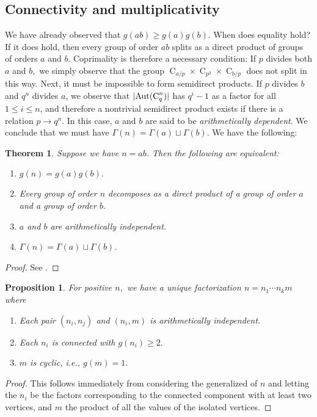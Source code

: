 \documentclass{article}
\DeclarePairedDelimiter\abs{\lvert}{\rvert}
\newcommand{\aut}[1]{\operatorname{Aut}(#1)}
\newcommand{\cyc}[1]{\operatorname{C}_{#1}}
\theoremstyle{plain}
\newtheorem{thm}{Theorem}[section]
\newtheorem{prop}{Proposition}[section]
\theoremstyle{definition}
\begin{document}
\subsection{Connectivity and multiplicativity}
We have already observed that $g(ab) \ge g(a)g(b).$ When does equality hold? If it does hold, then every group of order $ab$ splits as a direct product of groups of orders $a$ and $b.$ Coprimality is therefore a necessary condition: If $p$ divides both $a$ and $b,$ we simply observe that the group $\cyc{a/p} \times \cyc{p^2} \times \cyc{b/p}$ does not split in this way. Next, it must be impossible to form semidirect products. If $p$ divides $b$ and $q^n$ divides $a$, we observe that $\abs{\aut{\cyc{q}^n}}$ has $q^i - 1$ as a factor for all $1 \le i \le n$, and therefore a nontrivial semidirect product exists if there is a relation $p \rightarrow q^n.$ In this case, $a$ and $b$ are said to be \emph{arithmetically dependent}. We conclude that we must have $\Gamma(n) = \Gamma(a) \sqcup \Gamma(b)$.  We have the following:

\begin{thm}
	Suppose we have $n = ab$. Then the following are equivalent:
	\begin{enumerate}
		\item $g(n) = g(a)g(b).$
		\item Every group of order $n$ decomposes as a direct product of a group of order $a$ and a group of order $b.$
		\item $a$ and $b$ are arithmetically independent.
		\item $\Gamma(n) = \Gamma(a) \sqcup \Gamma(b)$.
	\end{enumerate}
\end{thm}
\begin{proof}
	See {\cite[Lem.~21.19]{monolith}}.
\end{proof}

\begin{prop}
	For positive $n,$ we have a unique factorization $n = n_1 \cdots n_k m$ where\pagebreak[3]
	\begin{enumerate} \listspace
		\item Each pair $(n_i, n_j)$ and $(n_i, m)$ is arithmetically independent.
		\item Each $n_i$ is connected with $g(n_i) \ge 2.$
		\item $m$ is cyclic, i.e., $g(m) = 1.$
	\end{enumerate} \textspace
\end{prop}
\begin{proof}
	This follows immediately from considering the generalized  of $n$ and letting the $n_i$ be the factors corresponding to the connected component with at least two vertices, and $m$ the product of all the values of the isolated vertices.
\end{proof}
\end{document}
